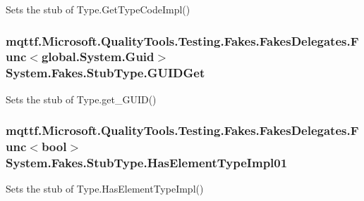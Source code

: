 Sets the stub of Type.\-Get\-Type\-Code\-Impl()

\hypertarget{class_system_1_1_fakes_1_1_stub_type_a39a40160e10c295daf159341014cd533}{
\subsubsection[{G\-U\-I\-D\-Get}]{\setlength{\rightskip}{0pt plus 5cm}mqttf.\-Microsoft.\-Quality\-Tools.\-Testing.\-Fakes.\-Fakes\-Delegates.\-Func$<$global.\-System.\-Guid$>$ System.\-Fakes.\-Stub\-Type.\-G\-U\-I\-D\-Get}}\label{class_system_1_1_fakes_1_1_stub_type_a39a40160e10c295daf159341014cd533}


Sets the stub of Type.\-get\-\_\-\-G\-U\-I\-D()

\hypertarget{class_system_1_1_fakes_1_1_stub_type_a64e5fecbb23d701f41a824e70b8b78c3}{
\subsubsection[{Has\-Element\-Type\-Impl01}]{\setlength{\rightskip}{0pt plus 5cm}mqttf.\-Microsoft.\-Quality\-Tools.\-Testing.\-Fakes.\-Fakes\-Delegates.\-Func$<$bool$>$ System.\-Fakes.\-Stub\-Type.\-Has\-Element\-Type\-Impl01}}\label{class_system_1_1_fakes_1_1_stub_type_a64e5fecbb23d701f41a824e70b8b78c3}


Sets the stub of Type.\-Has\-Element\-Type\-Impl()

